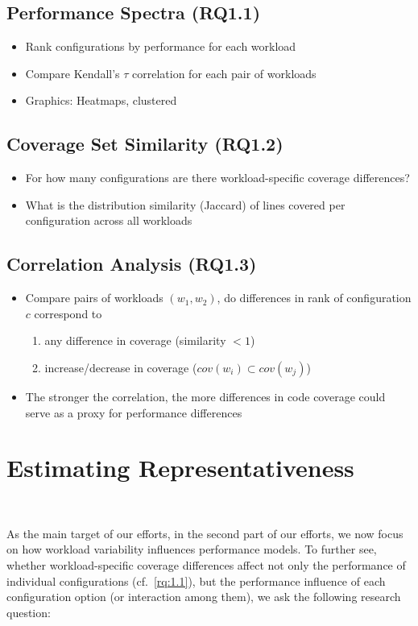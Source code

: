 \subsection{Performance Spectra (RQ1.1)}
{\color{teal}
\begin{itemize}
	\item Rank configurations by performance for each workload
	\item Compare Kendall's $\tau$ correlation for each pair of workloads
	\item Graphics: Heatmaps, clustered
\end{itemize}
}

\subsection{Coverage Set Similarity (RQ1.2)}
\begin{itemize}
	\item For how many configurations are there workload-specific coverage differences?
	\item What is the distribution similarity (Jaccard) of lines covered per configuration across all workloads
\end{itemize}

\subsection{Correlation Analysis (RQ1.3)}
\begin{itemize}
	\item Compare pairs of workloads $(w_1, w_2)$, do differences in rank of configuration $c$ correspond to 
	\begin{enumerate}
		\item any difference in coverage (similarity $< 1$)
		\item increase/decrease in coverage ($cov(w_i) \subset cov(w_j)$)

	\end{enumerate}
	\item The stronger the correlation, the more differences in code coverage could serve as a proxy for performance differences 
\end{itemize}

\clearpage
\section{Estimating Representativeness}~\label{sec:metric}

As the main target of our efforts, in the second part of our efforts, we now focus on how workload variability influences performance models. To further see, whether workload-specific coverage differences affect not only the performance of individual configurations (cf.~\ref{rq:1.1}), but the performance influence of each configuration option (or interaction among them), we ask the following research question:

